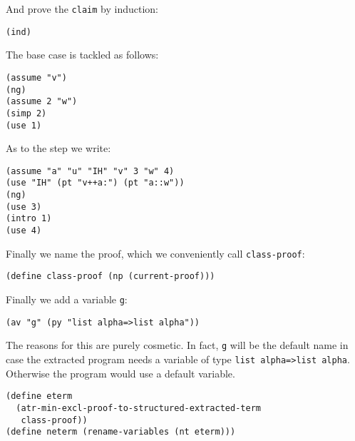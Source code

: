 \documentclass[12pt]{amsart}
\begin{document}
And prove the \texttt{claim} by induction:
\begin{verbatim}
(ind)
\end{verbatim}

The base case is tackled as follows:
\begin{verbatim}
(assume "v")
(ng)
(assume 2 "w")
(simp 2)
(use 1)
\end{verbatim}

As to the step we write:
\begin{verbatim}
(assume "a" "u" "IH" "v" 3 "w" 4)
(use "IH" (pt "v++a:") (pt "a::w"))
(ng)
(use 3)
(intro 1)
(use 4)
\end{verbatim}

Finally we name the proof, which we conveniently call \texttt{class-proof}:
\begin{verbatim}
(define class-proof (np (current-proof)))
\end{verbatim}
Finally we add a variable \texttt{g}:
\begin{verbatim}
(av "g" (py "list alpha=>list alpha"))
\end{verbatim}
The reasons for this are purely cosmetic. In fact, \texttt{g} will be
the default name in case the extracted program needs a variable of
type \texttt{list alpha=>list alpha}.  Otherwise the program would use
a default variable.
\begin{verbatim}
(define eterm
  (atr-min-excl-proof-to-structured-extracted-term
   class-proof))
(define neterm (rename-variables (nt eterm)))
\end{verbatim}

\end{document}
